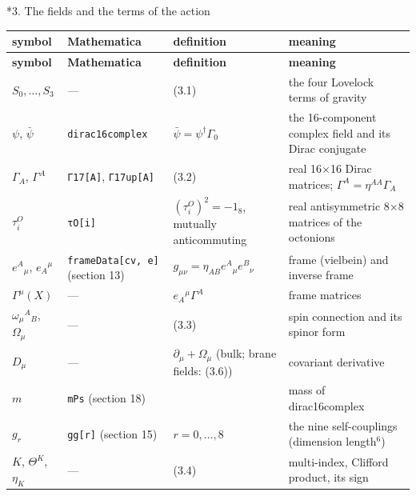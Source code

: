 \documentclass[10pt,a4paper]{article}
\makeatletter
\renewcommand\section{\@startsection{section}{1}{\z@}{-3.5ex \@plus -1ex \@minus -.2ex}{2.3ex \@plus.2ex}{\normalfont\Large\bfseries\raggedright}}
\makeatother
\begin{document}
\section*{3. The fields and the terms of the action}
{\small
\begin{longtable}{>{\raggedright\arraybackslash}p{}>{\raggedright\arraybackslash}p{}>{\raggedright\arraybackslash}p{}>{\raggedright\arraybackslash}p{}}
\toprule
\textbf{symbol} & \textbf{Mathematica} & \textbf{definition} & \textbf{meaning} \\
\midrule\endfirsthead
\toprule
\textbf{symbol} & \textbf{Mathematica} & \textbf{definition} & \textbf{meaning} \\
\midrule\endhead
\endfoot
\bottomrule\endlastfoot
$S_0,\dots,S_3$ & — & (3.1) & the four Lovelock terms of gravity \\
$\psi$, $\bar\psi$ & \texttt{dirac16complex} & $\bar\psi=\psi^\dagger\Gamma_0$ & the 16-component complex field and its Dirac conjugate \\
$\Gamma_A$, $\Gamma^A$ & \texttt{Γ17[A]}, \texttt{Γ17up[A]} & (3.2) & real 16×16 Dirac matrices; $\Gamma^A=\eta^{AA}\Gamma_A$ \\
$\tau^O_i$ & \texttt{τO[i]} & $(\tau^O_i)^2=-1_8$, mutually anticommuting & real antisymmetric 8×8 matrices of the octonions \\
$e^A{}_\mu$, $e_A{}^\mu$ & \texttt{frameData[cv, e]} (section 13) & $g_{\mu\nu}=\eta_{AB}e^A{}_\mu e^B{}_\nu$ & frame (vielbein) and inverse frame \\
$\Gamma^\mu(X)$ & — & $e_A{}^\mu\Gamma^A$ & frame matrices \\
$\omega_\mu{}^A{}_B$, $\Omega_\mu$ & — & (3.3) & spin connection and its spinor form \\
$D_\mu$ & — & $\partial_\mu+\Omega_\mu$ (bulk; brane fields: (3.6)) & covariant derivative \\
$m$ & \texttt{mPs} (section 18) &  & mass of dirac16complex \\
$g_r$ & \texttt{gg[r]} (section 15) & $r=0,\dots,8$ & the nine self-couplings (dimension length\texorpdfstring{\ensuremath{{}^{6}}}{⁶}) \\
$K$, $\Theta^K$, $\eta_K$ & — & (3.4) & multi-index, Clifford product, its sign \\

\end{longtable}}
\end{document}
